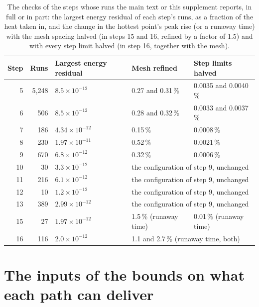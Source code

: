 \documentclass[preprint,12pt]{elsarticle}
\begin{document}
\begin{table}[!htbp]
\centering
\footnotesize
\caption{The checks of the steps whose runs the main text or this supplement reports, in full or in part: the largest energy residual of each step's runs, as a fraction of the heat taken in, and the change in the hottest point's peak rise (or a runaway time) with the mesh spacing halved (in steps 15 and 16, refined by a factor of 1.5) and with every step limit halved (in step 16, together with the mesh).}
\label{tab:s-checks}
\setlength{\tabcolsep}{4pt}
\begin{tabular}{rrlll}
\toprule
Step & Runs & Largest energy residual & Mesh refined & Step limits halved \\
\midrule
5 & 5,248 & $8.5\times10^{-12}$ & 0.27 and 0.31\,\% & 0.0035 and 0.0040\,\% \\
6 & 506 & $8.5\times10^{-12}$ & 0.28 and 0.32\,\% & 0.0033 and 0.0037\,\% \\
7 & 186 & $4.34\times10^{-12}$ & 0.15\,\% & 0.0008\,\% \\
8 & 230 & $1.97\times10^{-11}$ & 0.52\,\% & 0.0021\,\% \\
9 & 670 & $6.8\times10^{-12}$ & 0.32\,\% & 0.0006\,\% \\
10 & 30 & $3.3\times10^{-12}$ & \multicolumn{2}{l}{the configuration of step 9, unchanged} \\
11 & 216 & $6.1\times10^{-12}$ & \multicolumn{2}{l}{the configuration of step 9, unchanged} \\
12 & 10 & $1.2\times10^{-12}$ & \multicolumn{2}{l}{the configuration of step 9, unchanged} \\
13 & 389 & $2.99\times10^{-12}$ & \multicolumn{2}{l}{the configuration of step 9, unchanged} \\
15 & 27 & $1.97\times10^{-12}$ & 1.5\,\% (runaway time) & 0.01\,\% (runaway time) \\
16 & 116 & $2.0\times10^{-12}$ & \multicolumn{2}{l}{1.1 and 2.7\,\% (runaway time, both)} \\
\bottomrule
\end{tabular}
\end{table}

\section{The inputs of the bounds on what each path can deliver}
\label{sec:s-inputs}
\end{document}
